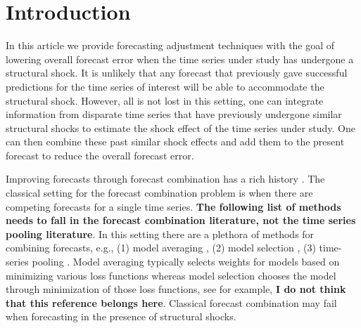 \documentclass[11pt]{article}
\theoremstyle{definition}
\begin{document}
\section{Introduction}

In this article we provide forecasting adjustment techniques with the goal of lowering overall forecast error when the time series under study has undergone a structural shock. It is unlikely that any forecast that previously gave successful predictions for the time series of interest will be able to accommodate the structural shock.  However, all is not lost in this setting, one can integrate information from disparate time series that have previously undergone similar structural shocks to estimate the shock effect of the time series under study. One can then combine these past similar shock effects and add them to the present forecast to reduce the overall forecast error.


Improving forecasts through forecast combination has a rich history \citep{bates1969combination, mundlak1978pooling, timmermann2006forecast, granger2014forecasting}.  
The classical setting for the forecast combination problem is when there are competing forecasts for a single time series.  %
\textbf{The following list of methods needs to fall in the forecast combination literature, not the time series pooling literature}. In this setting there are a plethora of methods for combining forecasts, e.g., (1) model averaging \citep{newbold2002forecast, timmermann2006forecast, hansen2008least}, (2) model selection \citep{lee2015model, greenaway2020multistep}, (3) time-series pooling \citep{mundlak1978pooling, zellner1991forecasting, lee2020estimation, plessen2020integrated}. Model averaging typically selects weights for models based on minimizing various loss functions whereas model selection chooses the model through minimization of those loss functions, see for example, \citet{fosten2019panel} \textbf{I do not think that this reference belongs here}. Classical forecast combination may fail when forecasting in the presence of structural shocks.
\end{document}
